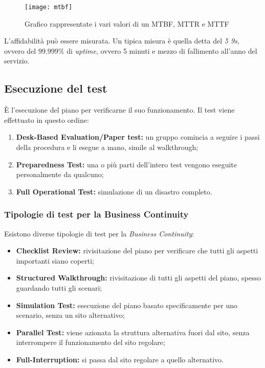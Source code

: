 \begin{figure}[H]
 \centering
 \texttt{[image: mtbf]}
 \caption{Grafico rappresentate i vari valori di un MTBF, MTTR e MTTF}
\end{figure}


L'affidabilità può essere misurata. Un tipica misura è quella detta del
\textit{5 9s}, ovvero del $99.999\%$ di \textit{uptime}, ovvero 5 minuti e
mezzo di fallimento all'anno del servizio.

\subsection{Esecuzione del test}

È l'esecuzione del piano per verificarne il suo funzionamento.
Il test viene effettuato in questo ordine:
\begin{enumerate}
  \item \textbf{Desk-Based Evaluation/Paper test:} un gruppo comincia a
  seguire i passi della procedura e li esegue a mano, simile al walkthrough;
  \item \textbf{Preparedness Test:} una o più parti dell'intero test vengono
  eseguite personalmente da qualcuno;
  \item \textbf{Full Operational Test:} simulazione di un disastro completo.
\end{enumerate}

\subsubsection{Tipologie di test per la Business Continuity}

Esistono diverse tipologie di test per la \textit{Business Continuity}:
\begin{itemize}
  \item \textbf{Checklist Review:} rivisitazione del piano per verificare
  che tutti gli aspetti importanti siano coperti;
  \item \textbf{Structured Walkthrough:} rivisitazione di tutti gli aspetti
  del piano, spesso guardando tutti gli
  scenari;
  \item \textbf{Simulation Test:} esecuzione del piano basato specificamente
  per uno scenario, senza un sito alternativo;
  \item \textbf{Parallel Test:} viene azionata la struttura alternativa fuori
  dal sito, senza interrompere il funzionamento del sito regolare;
  \item \textbf{Full-Interruption:} si passa dal sito regolare a quello
  alternativo.
\end{itemize}

